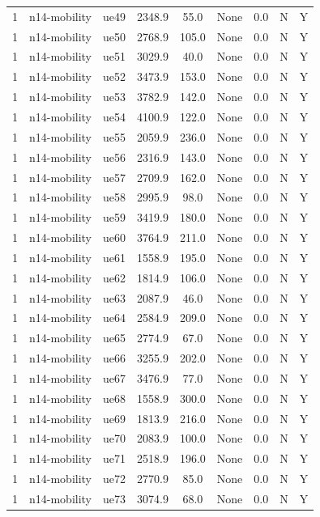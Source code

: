 \begin{table}[ht]
\begin{tabular}{|c|c|c|c|c|c|c|c|c|}
1 & n14-mobility & ue49 & 2348.9 & 55.0 & None & 0.0 & N & Y \\
1 & n14-mobility & ue50 & 2768.9 & 105.0 & None & 0.0 & N & Y \\
1 & n14-mobility & ue51 & 3029.9 & 40.0 & None & 0.0 & N & Y \\
1 & n14-mobility & ue52 & 3473.9 & 153.0 & None & 0.0 & N & Y \\
1 & n14-mobility & ue53 & 3782.9 & 142.0 & None & 0.0 & N & Y \\
1 & n14-mobility & ue54 & 4100.9 & 122.0 & None & 0.0 & N & Y \\
1 & n14-mobility & ue55 & 2059.9 & 236.0 & None & 0.0 & N & Y \\
1 & n14-mobility & ue56 & 2316.9 & 143.0 & None & 0.0 & N & Y \\
1 & n14-mobility & ue57 & 2709.9 & 162.0 & None & 0.0 & N & Y \\
1 & n14-mobility & ue58 & 2995.9 & 98.0 & None & 0.0 & N & Y \\
1 & n14-mobility & ue59 & 3419.9 & 180.0 & None & 0.0 & N & Y \\
1 & n14-mobility & ue60 & 3764.9 & 211.0 & None & 0.0 & N & Y \\
1 & n14-mobility & ue61 & 1558.9 & 195.0 & None & 0.0 & N & Y \\
1 & n14-mobility & ue62 & 1814.9 & 106.0 & None & 0.0 & N & Y \\
1 & n14-mobility & ue63 & 2087.9 & 46.0 & None & 0.0 & N & Y \\
1 & n14-mobility & ue64 & 2584.9 & 209.0 & None & 0.0 & N & Y \\
1 & n14-mobility & ue65 & 2774.9 & 67.0 & None & 0.0 & N & Y \\
1 & n14-mobility & ue66 & 3255.9 & 202.0 & None & 0.0 & N & Y \\
1 & n14-mobility & ue67 & 3476.9 & 77.0 & None & 0.0 & N & Y \\
1 & n14-mobility & ue68 & 1558.9 & 300.0 & None & 0.0 & N & Y \\
1 & n14-mobility & ue69 & 1813.9 & 216.0 & None & 0.0 & N & Y \\
1 & n14-mobility & ue70 & 2083.9 & 100.0 & None & 0.0 & N & Y \\
1 & n14-mobility & ue71 & 2518.9 & 196.0 & None & 0.0 & N & Y \\
1 & n14-mobility & ue72 & 2770.9 & 85.0 & None & 0.0 & N & Y \\
1 & n14-mobility & ue73 & 3074.9 & 68.0 & None & 0.0 & N & Y \\

\end{tabular}
\end{table}
